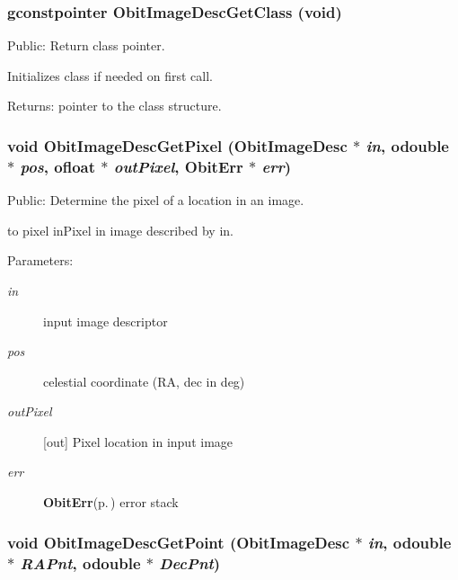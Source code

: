 \subsubsection{\setlength{\rightskip}{0pt plus 5cm}gconstpointer Obit\-Image\-Desc\-Get\-Class (void)}\label{ObitImageDesc_8c_a7}


Public: Return class pointer. 

Initializes class if needed on first call. \begin{Desc}
\item[Returns:]pointer to the class structure. \end{Desc}
\subsubsection{\setlength{\rightskip}{0pt plus 5cm}void Obit\-Image\-Desc\-Get\-Pixel ({\bf Obit\-Image\-Desc} $\ast$ {\em in}, {\bf odouble} $\ast$ {\em pos}, {\bf ofloat} $\ast$ {\em out\-Pixel}, {\bf Obit\-Err} $\ast$ {\em err})}\label{ObitImageDesc_8c_a15}


Public: Determine the pixel of a location in an image. 

to pixel in\-Pixel in image described by in. \begin{Desc}
\item[Parameters:]
\begin{description}
\item[{\em in}]input image descriptor \item[{\em pos}]celestial coordinate (RA, dec in deg) \item[{\em out\-Pixel}][out] Pixel location in input image \item[{\em err}]{\bf Obit\-Err}{\rm (p.\,\pageref{structObitErr})} error stack \end{description}
\end{Desc}
\subsubsection{\setlength{\rightskip}{0pt plus 5cm}void Obit\-Image\-Desc\-Get\-Point ({\bf Obit\-Image\-Desc} $\ast$ {\em in}, {\bf odouble} $\ast$ {\em RAPnt}, {\bf odouble} $\ast$ {\em Dec\-Pnt})}\label{ObitImageDesc_8c_a18}


